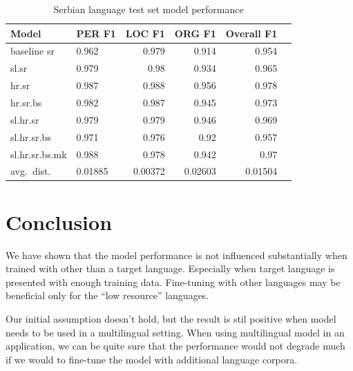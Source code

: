 \documentclass[sigconf]{acmart}
\begin{document}
\begin{table}[H]
  \caption{Serbian language test set model performance}
  \label{tab:eval_sr}
  \begin{tabular}{llrrrr}
    \toprule
    Model&PER F1&LOC F1&ORG F1&Overall F1\\
    \midrule
    baseline sr&0.962&0.979&0.914&0.954\\
    \midrule
    sl.sr&0.979&0.98&0.934&0.965\\
    hr.sr&0.987&0.988&0.956&0.978\\
    hr.sr.bs&0.982&0.987&0.945&0.973\\
    sl.hr.sr&0.979&0.979&0.946&0.969\\
    sl.hr.sr.bs&0.971&0.976&0.92&0.957\\
    sl.hr.sr.bs.mk&0.988&0.978&0.942&0.97\\
    \midrule
    avg.\ dist.&0.01885&0.00372&0.02603&0.01504\\
    \bottomrule
  \end{tabular}
\end{table}

\section{Conclusion}
\label{sec:conclusion}
We have shown that the model performance is not influenced substantially when trained with other than a target language.
Especially when target language is presented with enough training data.
Fine-tuning with other languages may be beneficial only for the ``low resource'' languages.

Our initial assumption doesn't hold, but the result is stil positive when model needs to be used in a multilingual setting.
When using multilingual model in an application, we can be quite sure that the performance would not degrade much if we would to fine-tune the model with additional language corpora.




\end{document}
